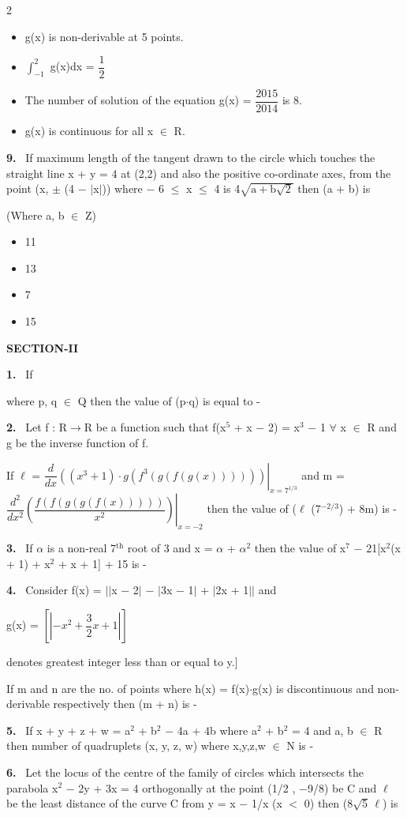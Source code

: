 \documentclass[10pt]{extarticle}
\newcommand{\sect}[1]{\par\smallskip\noindent\textbf{#1}\par}
\newcommand{\qn}[1]{\par\smallskip\noindent\textbf{#1.}~}
\newenvironment{qoptions}{\begin{itemize}[leftmargin=1.8em,itemsep=1pt,topsep=2pt,label={}]}{\end{itemize}}
\newcommand{\opt}[2]{\item[(#1)] #2}
\begin{document}
\begin{multicols}{2}
\begin{qoptions}
\opt{A}{g(x) is non-derivable at 5 points.}
\opt{B}{$\displaystyle\int_{-1}^{2}$ g(x)dx = $\dfrac12$}
\opt{C}{The number of solution of the equation g(x) = $\dfrac{2015}{2014}$ is 8.}
\opt{D}{g(x) is continuous for all x $\in$ R.}
\end{qoptions}
\qn{9} If maximum length of the tangent drawn to the circle which touches the straight line x + y = 4 at (2,2) and also the positive co-ordinate axes, from the point (x, $\pm$ (4 $-$ $|$x$|$)) where $-$ 6 $\le$ x $\le$ 4 is 4$\sqrt{\mathrm a+\mathrm b\sqrt2}$ then (a + b) is\par
(Where a, b $\in$ Z)
\begin{qoptions}
\opt{A}{11}
\opt{B}{13}
\opt{C}{7}
\opt{D}{15}
\end{qoptions}
\sect{SECTION-II}
\qn{1} If\par
\noindent{}\par
where p, q $\in$ Q then the value of (p$\cdot$q) is equal to -
\qn{2} Let f : R$\to$R be a function such that f(x$^5$ + x $-$ 2) = x$^3$ $-$ 1 $\forall$ x $\in$ R and g be the inverse function of f.\par
If $\ell$ = $\left.\dfrac{d}{dx}\left((x^3+1)\cdot g(f^3(g(f(g(x)))))\right)\right|_{x=7^{1/3}}$ and m = $\left.\dfrac{d^2}{dx^2}\left(\dfrac{f(f(g(g(f(x)))))}{x^2}\right)\right|_{x=-2}$ then the value of ($\ell$ (7$^{-2/3}$) + 8m) is -
\qn{3} If $\alpha$ is a non-real 7$^{\mathrm{th}}$ root of 3 and x = $\alpha$ + $\alpha^2$ then the value of x$^7$ $-$ 21[x$^2$(x + 1) + x$^2$ + x + 1] + 15 is -
\qn{4} Consider f(x) = $||$x $-$ 2$|$ $-$ $|$3x $-$ 1$|$ + $|$2x + 1$||$ and\par
g(x) = $\left[\left|-x^2+\dfrac32x+1\right|\right]$\par
[Note : [y] denotes greatest integer less than or equal to y.]\par
If m and n are the no. of points where h(x) = f(x)$\cdot$g(x) is discontinuous and non-derivable respectively then (m + n) is -
\qn{5} If x + y + z + w = a$^2$ + b$^2$ $-$ 4a + 4b where a$^2$ + b$^2$ = 4 and a, b $\in$ R then number of quadruplets (x, y, z, w) where x,y,z,w $\in$ N is -
\qn{6} Let the locus of the centre of the family of circles which intersects the parabola x$^2$ $-$ 2y + 3x = 4 orthogonally at the point (1/2 , $-$9/8) be C and $\ell$ be the least distance of the curve C from y = x $-$ 1/x (x $<$ 0) then (8$\sqrt5\,\ell$) is

\end{multicols}
\end{document}
